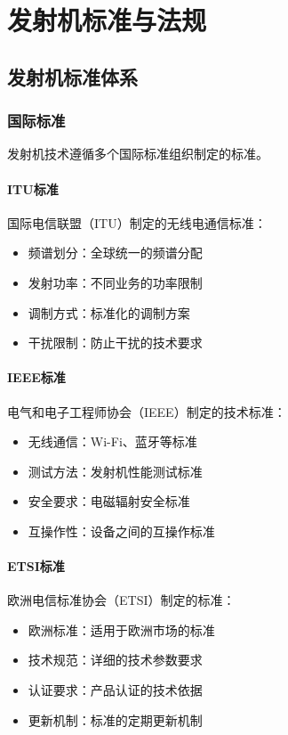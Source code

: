\documentclass[12pt,UTF8]{ctexbook}
\begin{document}
\part{发射机标准与法规}

\chapter{发射机标准体系}

\section{国际标准}

发射机技术遵循多个国际标准组织制定的标准。

\subsection{ITU标准}
国际电信联盟（ITU）制定的无线电通信标准：
\begin{itemize}[leftmargin=3.5em]
    \item 频谱划分：全球统一的频谱分配
    \item 发射功率：不同业务的功率限制
    \item 调制方式：标准化的调制方案
    \item 干扰限制：防止干扰的技术要求
\end{itemize}

\subsection{IEEE标准}
电气和电子工程师协会（IEEE）制定的技术标准：
\begin{itemize}[leftmargin=3.5em]
    \item 无线通信：Wi-Fi、蓝牙等标准
    \item 测试方法：发射机性能测试标准
    \item 安全要求：电磁辐射安全标准
    \item 互操作性：设备之间的互操作标准
\end{itemize}

\subsection{ETSI标准}
欧洲电信标准协会（ETSI）制定的标准：
\begin{itemize}[leftmargin=3.5em]
    \item 欧洲标准：适用于欧洲市场的标准
    \item 技术规范：详细的技术参数要求
    \item 认证要求：产品认证的技术依据
    \item 更新机制：标准的定期更新机制
\end{itemize}
\end{document}
